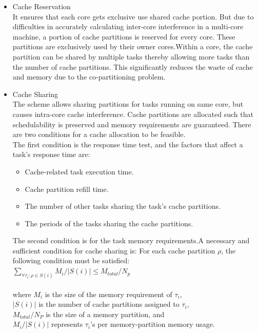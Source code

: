 \documentclass[conference]{IEEEtran}
\begin{document}
    \begin{itemize}
        \item Cache Reservation\\
        It ensures that each core gets exclusive use shared cache portion. But due to difficulties in accurately calculating inter-core interference in a multi-core machine, a portion of cache partitions is reserved for every core. These partitions are exclusively used by their owner cores.Within a core, the cache partition can be shared by multiple tasks thereby allowing more tasks than the number of cache partitions. This significantly reduces the waste of cache and memory due to the co-partitioning problem.
    \item Cache Sharing\\
    The  scheme allows sharing partitions for tasks running on same core, but causes intra-core cache interference. Cache partitions are allocated such that schedulability is preserved
    and memory requirements are guaranteed. There are two conditions for a cache allocation to
    be feasible.\\
    The first condition is the response time test, and the factors that affect a task’s response time
    are: 
    \begin{itemize}
        \item Cache-related task execution time.
        \item Cache partition refill time.
        \item The number of other tasks sharing the task’s cache partitions.
        \item The periods of the tasks sharing the cache partitions.
    \end{itemize}
    The second condition is for the task memory requirements.A  necessary and sufficient condition for cache sharing is: 
    For each cache partition $\rho$, the following condition must be satisfied:\\
    \newline
    $\sum_{\forall \tau_i : \rho \in S(i)} M_i/|S(i)| \leqslant M_{total}/N_p$\\\\
    where $M_i$ is the size of the memory requirement of $\tau_i$,\\
    $|S(i)|$ is the number of cache partitions assigned to $\tau_i$,\\
    $M_{total}/N_P$ is the size of a memory partition, and\\
    $M_i/|S(i)|$ represents $\tau_i$’s per memory-partition memory usage. \\

\end{itemize}
\end{document}
